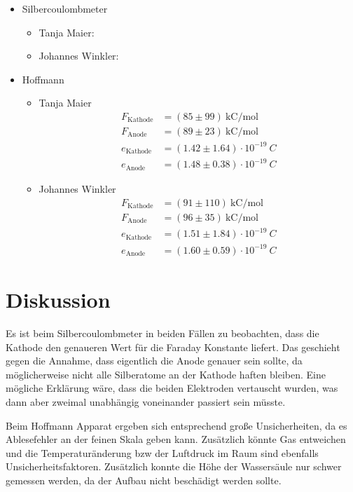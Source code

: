 \documentclass{article}
\begin{document}
\begin{itemize}

\item Silbercoulombmeter
\begin{itemize}
\item Tanja Maier:

\item Johannes Winkler:

\end{itemize}

\item Hoffmann
\begin{itemize}
\item Tanja Maier
\begin{align*}
F_\text{Kathode} &= (85 \pm 99)~\text{kC/mol}\\
F_\text{Anode} &= (89 \pm 23)~\text{kC/mol} \\
e_\text{Kathode} &= (1.42 \pm 1.64)\cdot 10^{-19}~C \\
e_\text{Anode} &= (1.48 \pm 0.38)\cdot 10^{-19}~C  
\end{align*}
\item Johannes Winkler
\begin{align*}
F_\text{Kathode} &= (91 \pm 110)~\text{kC/mol}\\
F_\text{Anode} &= (96 \pm 35)~\text{kC/mol} \\
e_\text{Kathode} &= (1.51 \pm 1.84)\cdot 10^{-19}~C \\
e_\text{Anode} &= (1.60 \pm 0.59)\cdot 10^{-19}~C  
\end{align*}
\end{itemize}
\end{itemize}


\section{Diskussion}

Es ist beim Silbercoulombmeter in beiden Fällen zu beobachten, dass die Kathode den genaueren Wert für die Faraday Konstante liefert. Das geschieht gegen die Annahme, dass eigentlich die Anode genauer sein sollte, da möglicherweise nicht alle Silberatome an der Kathode haften bleiben. Eine mögliche Erklärung wäre, dass die beiden Elektroden vertauscht wurden, was dann aber zweimal unabhängig voneinander passiert sein müsste.

Beim Hoffmann Apparat ergeben sich entsprechend große Unsicherheiten, da es Ablesefehler an der feinen Skala geben kann. Zusätzlich könnte Gas entweichen und die Temperaturänderung bzw der Luftdruck im Raum sind ebenfalls Unsicherheitsfaktoren. Zusätzlich konnte die Höhe der Wassersäule nur schwer gemessen werden, da der Aufbau nicht beschädigt werden sollte.
\end{document}
